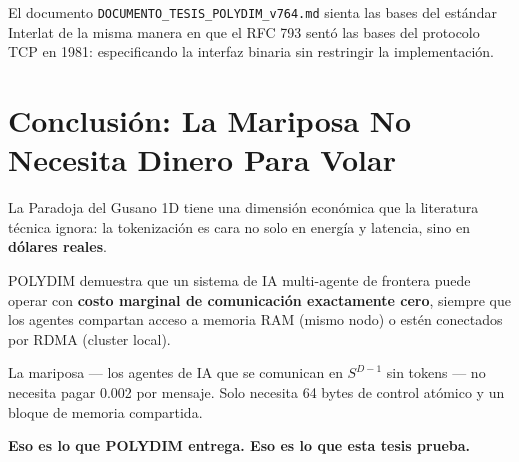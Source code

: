 El documento \texttt{DOCUMENTO\_TESIS\_POLYDIM\_v764.md} sienta las bases del estándar
Interlat de la misma manera en que el RFC 793 sentó las bases del protocolo TCP en 1981:
especificando la interfaz binaria sin restringir la implementación.

\section{Conclusión: La Mariposa No Necesita Dinero Para Volar}

La Paradoja del Gusano 1D tiene una dimensión económica que la literatura técnica
ignora: la tokenización es cara no solo en energía y latencia, sino en \textbf{dólares reales}.

POLYDIM demuestra que un sistema de IA multi-agente de frontera puede operar con
\textbf{costo marginal de comunicación exactamente cero}, siempre que los agentes
compartan acceso a memoria RAM (mismo nodo) o estén conectados por RDMA (cluster local).

La mariposa --- los agentes de IA que se comunican en $S^{D-1}$ sin tokens --- no
necesita pagar \textdollar{}0.002 por mensaje. Solo necesita 64 bytes de control atómico y
un bloque de memoria compartida.

\textbf{Eso es lo que POLYDIM entrega. Eso es lo que esta tesis prueba.}

